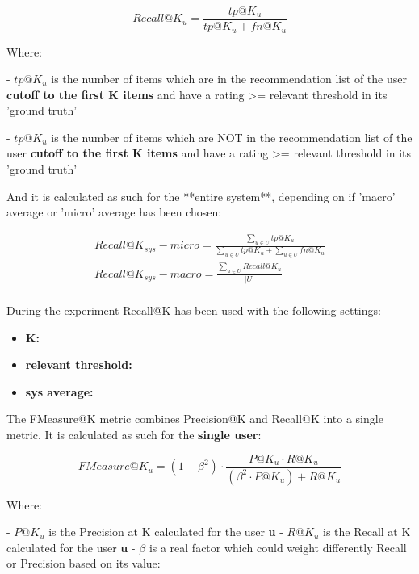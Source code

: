     \[
    Recall@K_u = \frac{tp@K_u}{tp@K_u + fn@K_u}
    \]

    Where:

    - $tp@K_u$ is the number of items which are in the recommendation list of the user
      \textbf{cutoff to the first K items} and have a rating >= relevant threshold in its 'ground truth'

    - $tp@K_u$ is the number of items which are NOT in the recommendation list of the user
      \textbf{cutoff to the first K items} and have a rating >= relevant threshold in its 'ground truth'

\hfill\break

And it is calculated as such for the **entire system**, depending on if 'macro' average or 'micro' average has been
chosen:

    \begin{gather*}
        Recall@K_{sys} - micro = \frac{\sum_{u \in U} tp@K_u}{\sum_{u \in U} tp@K_u + \sum_{u \in U} fn@K_u}\\
        Recall@K_{sys} - macro = \frac{\sum_{u \in U} Recall@K_u}{|U|}\\
    \end{gather*}

\hfill\break

During the experiment Recall@K has been used with the following settings:
\begin{itemize}
    \item \textbf{K:  }
    \item \textbf{relevant threshold:  }
    \item \textbf{sys average:  }
\end{itemize}


The FMeasure@K metric combines Precision@K and Recall@K into a single metric.
It is calculated as such for the \textbf{single user}:

    \[
    FMeasure@K_u = (1 + \beta^2) \cdot \frac{P@K_u \cdot R@K_u}{(\beta^2 \cdot P@K_u) + R@K_u}
    \]

    Where:

    - $P@K_u$ is the Precision at K calculated for the user \textbf{u}
    - $R@K_u$ is the Recall at K calculated for the user \textbf{u}
    - $\beta$ is a real factor which could weight differently Recall or Precision based on its value:

